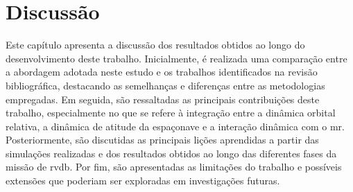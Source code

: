\chapter{Discussão}
\label{sec_Discussao}

Este capítulo apresenta a discussão dos resultados obtidos ao longo do desenvolvimento deste trabalho. 
Inicialmente, é realizada uma comparação entre a abordagem adotada neste estudo e os trabalhos identificados na revisão bibliográfica, destacando as semelhanças e diferenças entre as metodologias empregadas. 
Em seguida, são ressaltadas as principais contribuições deste trabalho, especialmente no que se refere à integração entre a dinâmica orbital relativa, a dinâmica de atitude da espaçonave e a interação dinâmica com o \gls{mr}. 
Posteriormente, são discutidas as principais lições aprendidas a partir das simulações realizadas e dos resultados obtidos ao longo das diferentes fases da missão de \gls{rvdb}. 
Por fim, são apresentadas as limitações do trabalho e possíveis extensões que poderiam ser exploradas em investigações futuras.





